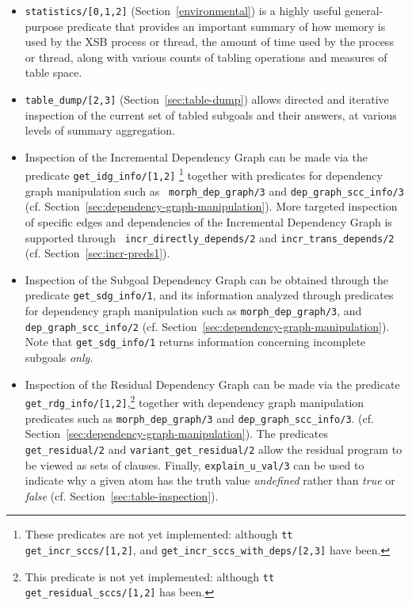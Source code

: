 \begin{itemize} 
\item {\tt statistics/[0,1,2]} (Section~\ref{environmental}) is a
  highly useful general-purpose predicate that provides an important
  summary of how memory is used by the XSB process or thread, the
  amount of time used by the process or thread, along with various
  counts of tabling operations and measures of table space.

\item {\tt table\_dump/[2,3]} (Section~\ref{sec:table-dump}) allows
  directed and iterative inspection of the current set of tabled
  subgoals and their answers, at various levels of summary
  aggregation.

\item Inspection of the Incremental Dependency Graph can be made via
  the predicate {\tt get\_idg\_info/[1,2]}
\footnote{These predicates
    are not yet implemented: although {\tt tt get\_incr\_sccs/[1,2]},
    and {\tt get\_incr\_sccs\_with\_deps/[2,3]} have been.} together
  with predicates for dependency graph manipulation such as {\tt
    morph\_dep\_graph/3} and {\tt dep\_graph\_scc\_info/3}
  (cf. Section~\ref{sec:dependency-graph-manipulation}).
%
 More targeted inspection of specific edges and dependencies of the
 Incremental Dependency Graph is supported through {\tt
   incr\_directly\_depends/2} and {\tt incr\_trans\_depends/2}
 (cf. Section~\ref{sec:incr-preds1}).

\item Inspection of the Subgoal Dependency Graph can be obtained
  through the predicate {\tt get\_sdg\_info/1}, and its information
  analyzed through predicates for dependency graph manipulation such
  as {\tt morph\_dep\_graph/3}, and {\tt dep\_graph\_scc\_info/2}
  (cf. Section~\ref{sec:dependency-graph-manipulation}).  Note that
  {\tt get\_sdg\_info/1} returns information concerning incomplete 
  subgoals {\em only}.

\item Inspection of the Residual Dependency Graph can be made via the
  predicate {\tt get\_rdg\_info/[1,2]},\footnote{This predicate is not
    yet implemented: although {\tt tt get\_residual\_sccs/[1,2]} has
    been.} together with dependency graph manipulation predicates such
  as {\tt morph\_dep\_graph/3} and {\tt dep\_graph\_scc\_info/3}.
  (cf. Section~\ref{sec:dependency-graph-manipulation}).  The
  predicates {\tt get\_residual/2} and {\tt variant\_get\_residual/2}
  allow the residual program to be viewed as sets of clauses.
  Finally, {\tt explain\_u\_val/3} can be used to indicate why a given
  atom has the truth value {\em undefined} rather than {\em true} or
  {\em false} (cf. Section~\ref{sec:table-inspection}).
\end{itemize}

